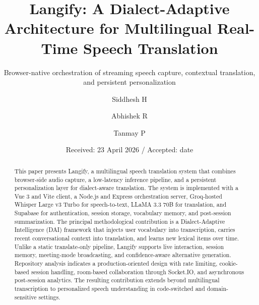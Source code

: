 \documentclass[twocolumn]{svjour3}
\begin{document}
\title{Langify: A Dialect-Adaptive Architecture for Multilingual Real-Time Speech Translation}
\subtitle{Browser-native orchestration of streaming speech capture, contextual translation, and persistent personalization}

\author{Siddhesh H \and
        Abhishek R \and
        Tanmay P}


\date{Received: 23 April 2026 / Accepted: date}

\maketitle

\begin{abstract}
This paper presents Langify, a multilingual speech translation system that combines browser-side audio capture, a low-latency inference pipeline, and a persistent personalization layer for dialect-aware translation. The system is implemented with a Vue 3 and Vite client, a Node.js and Express orchestration server, Groq-hosted Whisper Large v3 Turbo for speech-to-text, LLaMA 3.3 70B for translation, and Supabase for authentication, session storage, vocabulary memory, and post-session summarization. The principal methodological contribution is a Dialect-Adaptive Intelligence (DAI) framework that injects user vocabulary into transcription, carries recent conversational context into translation, and learns new lexical items over time. Unlike a static translate-only pipeline, Langify supports live interaction, session memory, meeting-mode broadcasting, and confidence-aware alternative generation. Repository analysis indicates a production-oriented design with rate limiting, cookie-based session handling, room-based collaboration through Socket.IO, and asynchronous post-session analytics. The resulting contribution extends beyond multilingual transcription to personalized speech understanding in code-switched and domain-sensitive settings.
\end{abstract}
\end{document}
